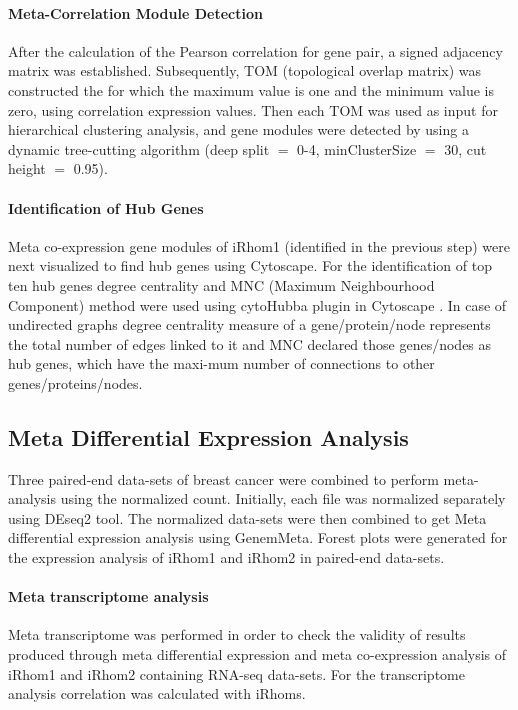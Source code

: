 \documentclass[fleqn,10pt,lineno]{wlpeerj}
\begin{document}
\paragraph{Meta-Correlation Module Detection}
After the calculation of the Pearson correlation for gene pair,  a signed adjacency matrix was established. Subsequently, TOM (topological overlap matrix) was constructed the for which the maximum value is one and the minimum value is zero, using correlation expression values. Then each TOM was used as input for hierarchical clustering analysis, and gene modules were detected by using a dynamic tree-cutting algorithm (deep split $=$ 0-4, minClusterSize $=$ 30, cut height $=$ 0.95).

\paragraph{Identification of Hub Genes}
Meta co-expression gene modules of iRhom1 (identified in the previous step) were next visualized to find hub genes using Cytoscape. For the identification of top ten hub genes degree centrality and MNC (Maximum Neighbourhood Component) method were used using cytoHubba plugin in Cytoscape \citep{Chin2014}. In case of undirected graphs degree centrality measure of a gene/protein/node represents the total number of edges linked to it and MNC declared those genes/nodes as hub genes, which have the maxi-mum number of connections to other genes/proteins/nodes.


\subsection*{Meta Differential Expression Analysis}
Three paired-end data-sets of breast cancer were combined to perform meta-analysis using the normalized count. Initially, each file was normalized separately using DEseq2 tool. The normalized data-sets were then combined to get Meta differential expression analysis using GenemMeta. Forest plots were generated for the expression analysis of iRhom1 and iRhom2 in paired-end data-sets.

\paragraph{Meta transcriptome analysis}
Meta transcriptome was performed in order to check the validity of results produced through meta differential expression and meta co-expression analysis of iRhom1 and iRhom2 containing RNA-seq data-sets. For the transcriptome analysis correlation was calculated with iRhoms.
\end{document}
